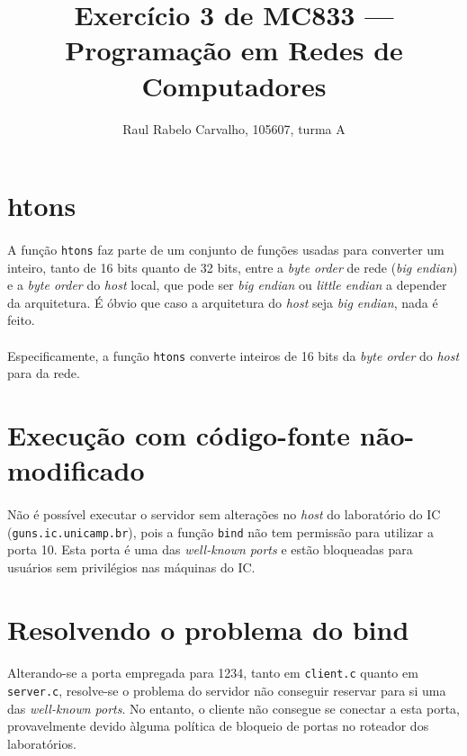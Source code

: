 \documentclass[a4paper,10pt,oneside,final,titlepage,onecolumn]{article}
\title{Exercício 3 de MC833 --- Programação em Redes de Computadores}
\author{Raul Rabelo Carvalho, 105607, turma A}
\begin{document}
\maketitle



\section{htons}
\paragraph{}A função \verb|htons| faz parte de um conjunto de funções usadas para converter um inteiro, tanto de 16 bits quanto de 32 bits, entre a \emph{byte order} de rede (\emph{big endian}) e a \emph{byte order} do \emph{host} local, que pode ser \emph{big endian} ou \emph{little endian} a depender da arquitetura. É óbvio que caso a arquitetura do \emph{host} seja \emph{big endian}, nada é feito.
\paragraph{}Especificamente, a função \verb|htons| converte inteiros de 16 bits da \emph{byte order} do \emph{host} para da rede.



\section{Execução com código-fonte não-modificado}
\paragraph{}Não é possível executar o servidor sem alterações no \emph{host} do laboratório do IC (\verb|guns.ic.unicamp.br|), pois a função \verb|bind| não tem permissão para utilizar a porta 10. Esta porta é uma das \emph{well-known ports} e estão bloqueadas para usuários sem privilégios nas máquinas do IC.



\section{Resolvendo o problema do bind}
\paragraph{}Alterando-se a porta empregada para 1234, tanto em \verb|client.c| quanto em \verb|server.c|, resolve-se o problema do servidor não conseguir reservar para si uma das \emph{well-known ports}. No entanto, o cliente não consegue se conectar a esta porta, provavelmente devido àlguma política de bloqueio de portas no roteador dos laboratórios.
\end{document}
